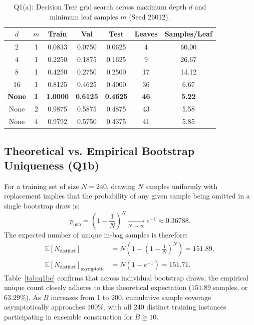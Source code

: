 \documentclass[10pt,twocolumn,letterpaper]{article}
\begin{document}
\begin{table}[t]
\centering
\small
\caption{Q1(a): Decision Tree grid search across maximum depth $d$ and minimum leaf samples $m$ (Seed 26012).}
\label{tab:q1a}
\begin{tabular}{ccccccc}
\toprule
$d$ & $m$ & Train & Val & Test & Leaves & Samples/Leaf \\
\midrule
2 & 1 & 0.0833 & 0.0750 & 0.0625 & 4 & 60.00 \\
4 & 1 & 0.2250 & 0.1875 & 0.1625 & 9 & 26.67 \\
8 & 1 & 0.4250 & 0.2750 & 0.2500 & 17 & 14.12 \\
16 & 1 & 0.8125 & 0.4625 & 0.4000 & 36 & 6.67 \\
\textbf{None} & \textbf{1} & \textbf{1.0000} & \textbf{0.6125} & \textbf{0.4625} & \textbf{46} & \textbf{5.22} \\
None & 2 & 0.9875 & 0.5875 & 0.4875 & 43 & 5.58 \\
None & 4 & 0.9792 & 0.5750 & 0.4375 & 41 & 5.85 \\
\bottomrule
\end{tabular}
\end{table}

\subsection{Theoretical vs. Empirical Bootstrap Uniqueness (Q1b)}
For a training set of size $N=240$, drawing $N$ samples uniformly with replacement implies that the probability of any given sample being omitted in a single bootstrap draw is:
\begin{equation}
    p_{\text{oob}} = \left(1 - \frac{1}{N}\right)^N \xrightarrow[N \to \infty]{} e^{-1} \approx 0.36788.
\end{equation}
The expected number of unique in-bag samples is therefore:
\begin{align}
    \mathbb{E}[N_{\text{distinct}}] &= N \left(1 - \left(1 - \frac{1}{N}\right)^N\right) = 151.89, \\
    \mathbb{E}[N_{\text{distinct}}]_{\text{asymptotic}} &= N (1 - e^{-1}) = 151.71.
\end{align}
Table~\ref{tab:q1bc} confirms that across individual bootstrap draws, the empirical unique count closely adheres to this theoretical expectation ($151.89$ samples, or $63.29\%$). As $B$ increases from 1 to 200, cumulative sample coverage asymptotically approaches $100\%$, with all 240 distinct training instances participating in ensemble construction for $B \ge 10$.
\end{document}
